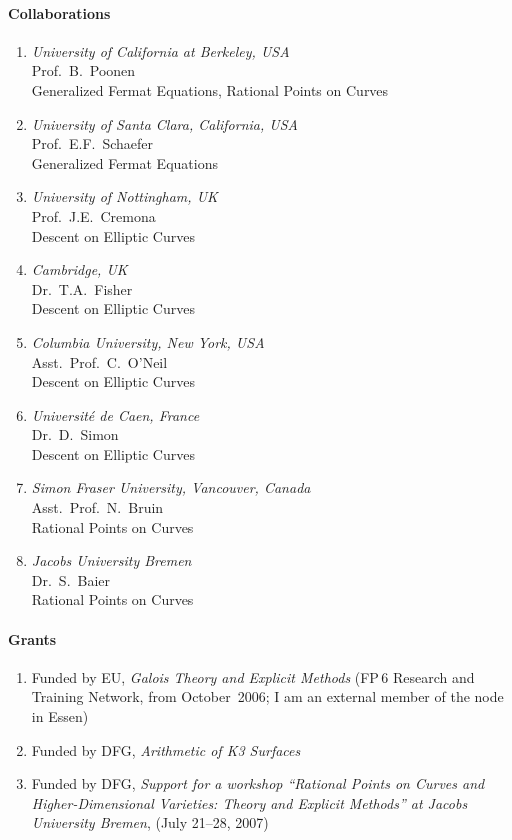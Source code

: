 \paragraph{Collaborations}

\begin{enumerate}
  \item {\sl University of California at Berkeley, USA} \\
        Prof.~B.~Poonen \\
        Generalized Fermat Equations, Rational Points on Curves
  \item {\sl University of Santa Clara, California, USA} \\
        Prof.~E.F.~Schaefer \\
        Generalized Fermat Equations
  \item {\sl University of Nottingham, UK} \\
        Prof.~J.E.~Cremona \\
        Descent on Elliptic Curves
  \item {\sl Cambridge, UK} \\
        Dr.~T.A.~Fisher \\
        Descent on Elliptic Curves
  \item {\sl Columbia University, New York, USA} \\
        Asst.~Prof.~C.~O'Neil \\
        Descent on Elliptic Curves
  \item {\sl Universit\'e de Caen, France} \\
        Dr.~D.~Simon \\
        Descent on Elliptic Curves
  \item {\sl Simon Fraser University, Vancouver, Canada} \\
        Asst.~Prof.~N.~Bruin \\
        Rational Points on Curves
  \item {\sl Jacobs University Bremen} \\
        Dr.~S.~Baier \\
        Rational Points on Curves
\end{enumerate}


\paragraph{Grants}
\begin{enumerate}
  \item Funded by EU, \emph{Galois Theory and Explicit Methods}
        (FP\,6 Research and Training Network, from October~2006;
        I am an external member of the node in Essen)
  \item Funded by DFG, \emph{Arithmetic of K3 Surfaces}

  \item Funded by DFG, \emph{Support for a workshop ``Rational Points on Curves
        and Higher-Dimensional Varieties: Theory  and Explicit Methods''
        at Jacobs University Bremen}, (July 21--28, 2007)
\end{enumerate}


